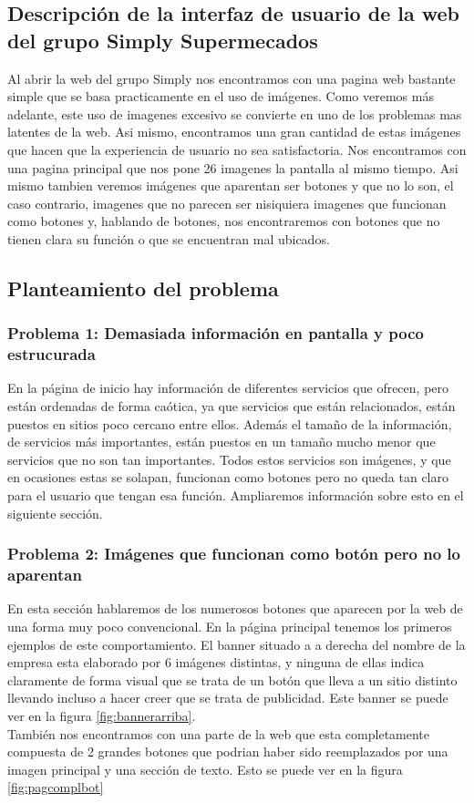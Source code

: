 \documentclass[a4paper,11pt]{article}
\begin{document}
\subsection{Descripción de la interfaz de usuario de la web del grupo Simply Supermecados}
Al abrir la web del grupo Simply nos encontramos con una pagina web bastante simple que se basa practicamente en el uso de imágenes. Como veremos más adelante, este uso de imagenes excesivo se convierte en uno de los problemas mas latentes de la web.
Asi mismo, encontramos una gran cantidad de estas imágenes que hacen que la experiencia de usuario no sea satisfactoria. Nos encontramos con una pagina principal que nos pone 26 imagenes la pantalla al mismo tiempo. Asi mismo tambien veremos imágenes que aparentan ser botones y que no lo son, el caso contrario, imagenes que no parecen ser nisiquiera imagenes que funcionan como botones y, hablando de botones, nos encontraremos con botones que no tienen clara su función o que se encuentran mal ubicados.


\subsection{Planteamiento del problema}
\subsubsection{Problema 1: Demasiada información en pantalla y poco estrucurada}
En la página de inicio hay información de diferentes servicios que ofrecen, pero están ordenadas de forma caótica, ya que servicios que están relacionados, están puestos en sitios poco cercano entre ellos. Además el tamaño de la información, de servicios más importantes, están puestos en un tamaño mucho menor que servicios que no son tan importantes. Todos estos servicios son imágenes, y que en ocasiones estas se solapan,  funcionan como botones pero no queda tan claro para el usuario que tengan esa función. Ampliaremos información sobre esto en el siguiente sección.

\subsubsection{Problema 2: Imágenes que funcionan como botón pero no lo aparentan}
En esta sección hablaremos de los numerosos botones que aparecen por la web de una forma muy poco convencional.
En la página principal tenemos los primeros ejemplos de este comportamiento. El banner situado a a derecha del nombre de la empresa esta elaborado por 6 imágenes distintas, y ninguna de ellas indica claramente de forma visual que se trata de un botón que lleva a un sitio distinto llevando incluso a hacer creer que se trata de publicidad. Este banner se puede ver en la figura \ref{fig:bannerarriba}.\\
También nos encontramos con una parte de la web que esta completamente compuesta de 2 grandes botones que podrian haber sido reemplazados por una imagen principal y una sección de texto.
Esto se puede ver en la figura \ref{fig:pagcomplbot}
\end{document}
